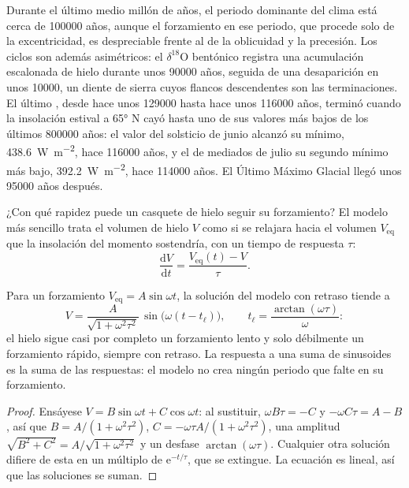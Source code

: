 Durante el último medio millón de años, el periodo dominante del clima está cerca de \num{100000} años,
aunque el forzamiento en ese periodo, que procede solo de la excentricidad, es despreciable
frente al de la oblicuidad y la precesión. Los ciclos son además asimétricos: el $\delta^{18}$O bentónico
registra una acumulación escalonada de hielo durante unos \num{90000} años, seguida de una desaparición en unos
\num{10000}, un diente de sierra cuyos flancos descendentes son las terminaciones. El último , desde
hace unos \num{129000} hasta hace unos \num{116000} años, terminó cuando la insolación estival a \ang{65} N cayó
hasta uno de sus valores más bajos de los últimos \num{800000} años: el valor del solsticio de junio alcanzó su
mínimo, \qty{438.6}{W.m^{-2}}, hace \num{116000} años, y el de mediados de julio su segundo mínimo
más bajo, \qty{392.2}{W.m^{-2}}, hace \num{114000} años. El Último Máximo Glacial llegó unos
\num{95000} años después.

¿Con qué rapidez puede un casquete de hielo seguir su forzamiento? El modelo más sencillo trata el volumen de hielo $V$ como
si se relajara hacia el volumen $V_{\mathrm{eq}}$ que la insolación del momento sostendría, con un
tiempo de respuesta $\tau$:
\[
  \frac{\mathrm dV}{\mathrm dt} = \frac{V_{\mathrm{eq}}(t) - V}{\tau} .
\]

\begin{proposition}\label{prop:b2:orbital-forcing:lag}
Para un forzamiento $V_{\mathrm{eq}} = A\sin\omega t$, la solución del modelo con retraso tiende a
\[
  V = \frac{A}{\sqrt{1 + \omega^2\tau^2}}\,\sin\bigl(\omega(t - t_{\ell})\bigr),\qquad
  t_{\ell} = \frac{\arctan(\omega\tau)}{\omega} :
\]
el hielo sigue casi por completo un forzamiento lento y solo débilmente un forzamiento rápido, siempre con retraso. La respuesta
a una suma de sinusoides es la suma de las respuestas: el modelo no crea ningún periodo que falte en su
forzamiento.
\end{proposition}

\begin{proof}
Ensáyese $V = B\sin\omega t + C\cos\omega t$: al sustituir, $\omega B\tau = -C$ y $-\omega C\tau = A -
B$, así que $B = A/(1 + \omega^2\tau^2)$, $C = -\omega\tau A/(1 + \omega^2\tau^2)$, una amplitud
$\sqrt{B^2 + C^2} = A/\sqrt{1 + \omega^2\tau^2}$ y un desfase $\arctan(\omega\tau)$. Cualquier otra
solución difiere de esta en un múltiplo de $\mathrm e^{-t/\tau}$, que se extingue. La
ecuación es lineal, así que las soluciones se suman.
\end{proof}

